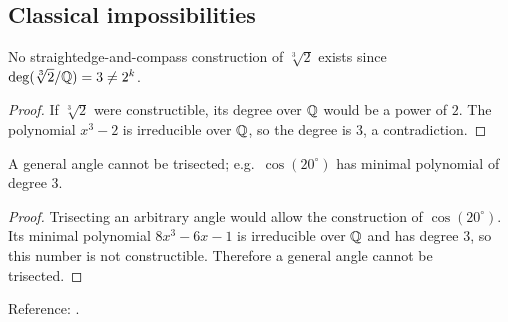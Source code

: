\subsection{Classical impossibilities}
\begin{corollary}
No straightedge-and-compass construction of $\sqrt[3]{2}$ exists since $\deg(\sqrt[3]{2}/\mathbb{Q})=3\ne 2^k$.
\end{corollary}
\begin{proof}
If $\sqrt[3]{2}$ were constructible, its degree over $\mathbb{Q}$ would be a power of $2$. The polynomial $x^3-2$ is irreducible over $\mathbb{Q}$, so the degree is $3$, a contradiction.
\end{proof}
\begin{corollary}
A general angle cannot be trisected; e.g.\ $\cos(20^\circ)$ has minimal polynomial of degree $3$.
\end{corollary}
\begin{proof}
Trisecting an arbitrary angle would allow the construction of $\cos(20^\circ)$. Its minimal polynomial $8x^3-6x-1$ is irreducible over $\mathbb{Q}$ and has degree $3$, so this number is not constructible. Therefore a general angle cannot be trisected.
\end{proof}
Reference: \cite[\S13]{DF}.

